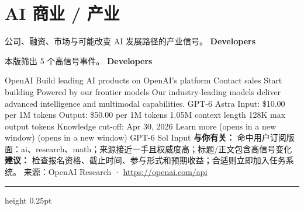 \documentclass[10.5pt]{ctexart}
\begin{document}
\section*{AI 商业 / 产业}
{\color{ormuted} 公司、融资、市场与可能改变 AI 发展路径的产业信号。}
\vspace{2mm}
{\LARGE\bfseries Developers}\par
\vspace{1mm}
{\color{ormuted} 本版筛出 5 个高信号事件。}
\vspace{3mm}
{\Large\bfseries Developers}\par
OpenAI Build leading AI products on OpenAI’s platform Contact sales Start building Powered by our frontier models Our industry-leading models deliver advanced intelligence and multimodal capabilities. GPT-6 Astra Input: \$10.00 per 1M tokens Output: \$50.00 per 1M tokens 1.05M context length 128K max output tokens Knowledge cut-off: Apr 30, 2026 Learn more (opens in a new window) (opens in a new window) GPT-6 Sol Input
\textbf{与你有关：} 命中用户订阅版面：ai、research、math；来源接近一手且权威度高；标题/正文包含高信号变化
\textbf{建议：} 检查报名资格、截止时间、参与形式和预期收益；合适则立即加入任务系统。
{\footnotesize\color{ormuted} 来源：OpenAI Research · \url{https://openai.com/api}}
\vspace{4mm}
\hrule height 0.25pt
\vspace{3mm}
\end{document}
